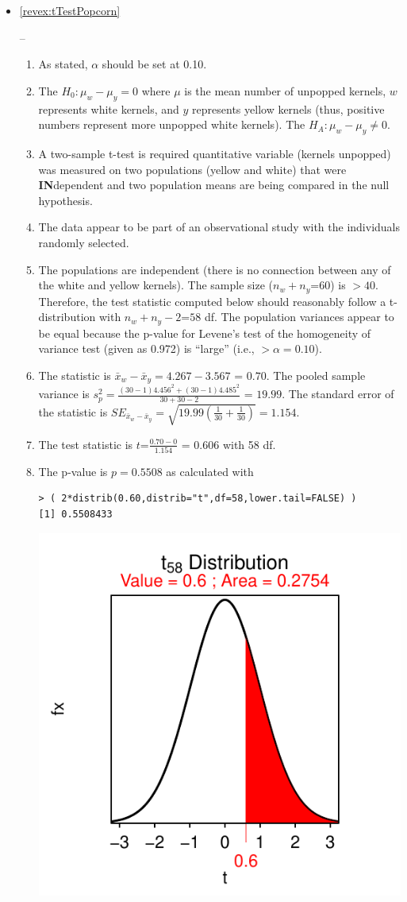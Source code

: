 \documentclass[10pt,openany]{book}\usepackage[]{graphicx}\usepackage[]{color}
\makeatletter
\newenvironment{kframe}{%
 \def\at@end@of@kframe{}%
 \ifinner\ifhmode%
  \def\at@end@of@kframe{\end{minipage}}%
  \begin{minipage}{\columnwidth}%
 \fi\fi%
 \def\FrameCommand##1{\hskip\@totalleftmargin \hskip-\fboxsep
 \colorbox{shadecolor}{##1}\hskip-\fboxsep
     \hskip-\linewidth \hskip-\@totalleftmargin \hskip\columnwidth}%
 \MakeFramed {\advance\hsize-\width
   \@totalleftmargin\z@ \linewidth\hsize
   \@setminipage}}%
 {\par\unskip\endMakeFramed%
 \at@end@of@kframe}
\newenvironment{knitrout}{}{} %
\makeatother
\begin{document}
\begin{itemize}
  \item \hypertarget{ans:tTestPopcorn}{\ref{revex:tTestPopcorn}} --
    \begin{enumerate}
      \item As stated, $\alpha$ should be set at 0.10.
      \item The $H_{0}:\mu_{w}-\mu_{y}=0$ where $\mu$ is the mean number of unpopped kernels, $w$ represents white kernels, and $y$ represents yellow kernels (thus, positive numbers represent more unpopped white kernels).  The $H_{A}:\mu_{w}-\mu_{y}\neq0$.
      \item A two-sample t-test is required quantitative variable (kernels unpopped) was measured on two populations (yellow and white) that were \textbf{IN}dependent and two population means are being compared in the null hypothesis.
      \item The data appear to be part of an observational study with the individuals randomly selected.
      \item The populations are independent (there is no connection between any of the white and yellow kernels).  The sample size ($n_{w}+n_{y}$=60) is $>40$.  Therefore, the test statistic computed below should reasonably follow a t-distribution with $n_{w}+n_{y}-2$=$58$ df.  The population variances appear to be equal because the p-value for Levene's test of the homogeneity of variance test (given as 0.972) is ``large'' (i.e., $>\alpha=0.10$).
      \item The statistic is $\bar{x}_{w}-\bar{x}_{y} = 4.267-3.567$ = $0.70$.  The pooled sample variance is $s_{p}^{2}=\frac{(30-1)4.456^{2}+(30-1)4.485^{2}}{30+30-2}$ = $19.99$.  The standard error of the statistic is $SE_{\bar{x}_{w}-\bar{x}_{y}}=\sqrt{19.99\left(\frac{1}{30}+\frac{1}{30} \right)} = 1.154$.
      \item The test statistic is $t$=$\frac{0.70-0}{1.154}$ = $0.606$ with 58 df.
      \item The p-value is $p=0.5508$ as calculated with
\begin{knitrout}
\color{fgcolor}\begin{kframe}
\begin{verbatim}
> ( 2*distrib(0.60,distrib="t",df=58,lower.tail=FALSE) )
[1] 0.5508433
\end{verbatim}
\end{kframe}

{\centering \includegraphics[width=.4\linewidth]{Figs/unnamed-chunk-375-1} 

}
\end{knitrout}
\end{enumerate}
\end{itemize}
\end{document}
